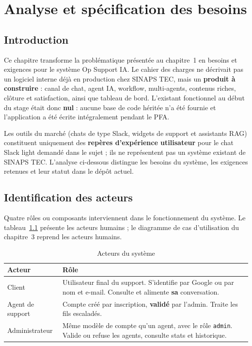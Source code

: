 \chapter{Analyse et spécification des besoins}

\section{Introduction}

Ce chapitre transforme la problématique présentée au chapitre~1 en besoins et exigences pour le système Op Support IA. Le cahier des charges ne décrivait pas un logiciel interne déjà en production chez SINAPS TEC, mais un \textbf{produit à construire} : canal de chat, agent IA, workflow, multi-agents, contenus riches, clôture et satisfaction, ainsi que tableau de bord. L'existant fonctionnel au début du stage était donc \textbf{nul} : aucune base de code héritée n'a été fournie et l'application a été écrite intégralement pendant le PFA.

Les outils du marché (chats de type Slack, widgets de support et assistants RAG) constituent uniquement des \textbf{repères d'expérience utilisateur} pour le chat \og Slack light \fg{} demandé dans le sujet ; ils ne représentent pas un système existant de SINAPS TEC. L'analyse ci-dessous distingue les besoins du système, les exigences retenues et leur statut dans le dépôt actuel.

\section{Identification des acteurs}

Quatre rôles ou composants interviennent dans le fonctionnement du système. Le tableau~\ref{tab:acteurs} présente les acteurs humains ; le diagramme de cas d'utilisation du chapitre~3 reprend les acteurs humains.

\begin{table}[H]
\centering
\caption{Acteurs du système}
\label{tab:acteurs}
\begin{tabularx}{\textwidth}{|l|X|}
\hline
\textbf{Acteur} & \textbf{Rôle} \\
\hline
Client & Utilisateur final du support. S'identifie par Google ou par nom et e-mail. Consulte et alimente \textbf{sa} conversation. \\
\hline
Agent de support & Compte créé par inscription, \textbf{validé} par l'admin. Traite les fils escaladés. \\
\hline
Administrateur & Même modèle de compte qu'un agent, avec le rôle \texttt{admin}. Valide ou refuse les agents, consulte stats et historique. \\
\hline
\end{tabularx}
\end{table}

